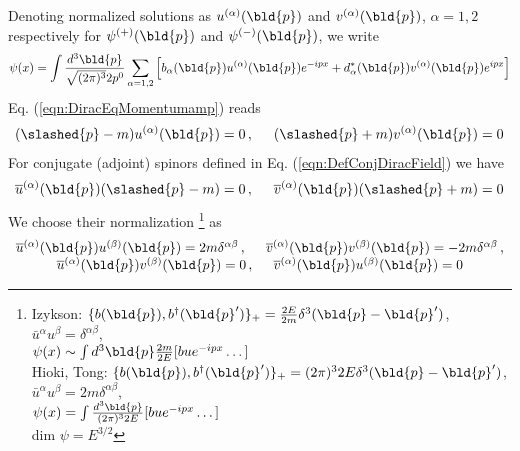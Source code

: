 Denoting normalized solutions as $u^{(\alpha)}(\bld{p})$ and $v^{(\alpha)}(\bld{p})$,
$\alpha = 1, 2$ respectively for $\psi^{(+)}(\bld{p})$ and  $\psi^{(-)}(\bld{p})$,
we write
\begin{eqnarray}
\psi(x) = \int \frac{d^3 \bld{p}}{\sqrt{(2\pi)^3} 2 p^0}
\sum_{\alpha = 1, 2} \left[
b_\alpha(\bld{p}) u^{(\alpha)}(\bld{p}) e^{-ipx} + d_\alpha^*(\bld{p}) v^{(\alpha)}(\bld{p}) e^{ipx}
\right]
\end{eqnarray}
Eq. (\ref{eqn:DiracEqMomentumamp}) reads
\begin{eqnarray}
(\slashed{p} - m) u^{(\alpha)}(\bld{p}) = 0\,,
\hspace{5mm}
(\slashed{p} + m) v^{(\alpha)}(\bld{p}) = 0
\label{eqn:DiracEqDiracspinors}
\end{eqnarray}
For conjugate (adjoint) spinors defined in Eq. (\ref{eqn:DefConjDiracField}) we have
\begin{eqnarray}
\overline{u}^{(\alpha)}(\bld{p}) (\slashed{p} - m) = 0\,,
\hspace{5mm}
\overline{v}^{(\alpha)}(\bld{p}) (\slashed{p} + m) = 0
\label{eqn:DiracEqConjspinors}
\end{eqnarray}
We choose their normalization
\footnote{%
Izykson: $\{ b(\bld{p}),b^\dagger(\bld{p}') \}_+ = \frac{2E}{2m}\delta^3(\bld{p}-\bld{p}')$,
$\bar{u}^\alpha u^\beta = \delta^{\alpha \beta}$,\\
\hspace{20mm}$\psi(x) \sim \int d^3\bld{p}\frac{2m}{2E}[ b u e^{-ipx} \dots]$\\
Hioki, Tong: $\{ b(\bld{p}),b^\dagger(\bld{p}') \}_+ = (2\pi)^3 2E\delta^3(\bld{p}-\bld{p}')$,
$\bar{u}^\alpha u^\beta = 2m \delta^{\alpha \beta}$,\\
\hspace{20mm}$\psi(x) = \int \frac{d^3\bld{p}}{(2\pi)^32E}[ b u e^{-ipx} \dots]$\\
dim $\psi = E^{3/2}$
}%
 as
\begin{eqnarray}
\begin{array}{c}
\overline{u}^{(\alpha)}(\bld{p})
u^{(\beta)}(\bld{p})
= 2m \delta^{\alpha \beta}\,,
\hspace{5mm}
\overline{v}^{(\alpha)}(\bld{p})
v^{(\beta)}(\bld{p})
= -2m \delta^{\alpha \beta}\,,
\\
\overline{u}^{(\alpha)}(\bld{p})
v^{(\beta)}(\bld{p})
= 0\,,
\hspace{5mm}
\overline{v}^{(\alpha)}(\bld{p})
u^{(\beta)}(\bld{p})
= 0
\end{array}
\end{eqnarray}
